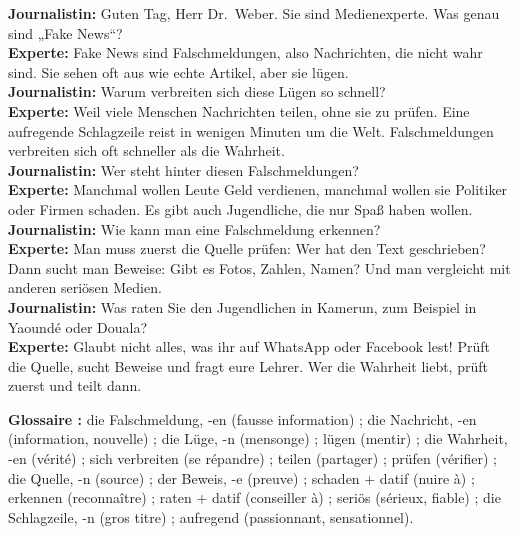\documentclass[11pt]{article}
\begin{document}
\begin{textebox}
\textbf{Journalistin:} Guten Tag, Herr Dr.~Weber. Sie sind Medienexperte. Was genau sind „Fake News“?\\
\textbf{Experte:} Fake News sind Falschmeldungen, also Nachrichten, die nicht wahr sind. Sie sehen oft aus wie echte Artikel, aber sie lügen.\\
\textbf{Journalistin:} Warum verbreiten sich diese Lügen so schnell?\\
\textbf{Experte:} Weil viele Menschen Nachrichten teilen, ohne sie zu prüfen. Eine aufregende Schlagzeile reist in wenigen Minuten um die Welt. Falschmeldungen verbreiten sich oft schneller als die Wahrheit.\\
\textbf{Journalistin:} Wer steht hinter diesen Falschmeldungen?\\
\textbf{Experte:} Manchmal wollen Leute Geld verdienen, manchmal wollen sie Politiker oder Firmen schaden. Es gibt auch Jugendliche, die nur Spaß haben wollen.\\
\textbf{Journalistin:} Wie kann man eine Falschmeldung erkennen?\\
\textbf{Experte:} Man muss zuerst die Quelle prüfen: Wer hat den Text geschrieben? Dann sucht man Beweise: Gibt es Fotos, Zahlen, Namen? Und man vergleicht mit anderen seriösen Medien.\\
\textbf{Journalistin:} Was raten Sie den Jugendlichen in Kamerun, zum Beispiel in Yaoundé oder Douala?\\
\textbf{Experte:} Glaubt nicht alles, was ihr auf WhatsApp oder Facebook lest! Prüft die Quelle, sucht Beweise und fragt eure Lehrer. Wer die Wahrheit liebt, prüft zuerst und teilt dann.
\end{textebox}

\textbf{Glossaire :} die Falschmeldung, -en (fausse information) ; die Nachricht, -en (information, nouvelle) ; die Lüge, -n (mensonge) ; lügen (mentir) ; die Wahrheit, -en (vérité) ; sich verbreiten (se répandre) ; teilen (partager) ; prüfen (vérifier) ; die Quelle, -n (source) ; der Beweis, -e (preuve) ; schaden + datif (nuire à) ; erkennen (reconnaître) ; raten + datif (conseiller à) ; seriös (sérieux, fiable) ; die Schlagzeile, -n (gros titre) ; aufregend (passionnant, sensationnel).
\end{document}
